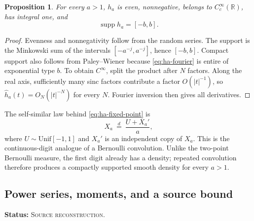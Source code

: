 \documentclass[11pt,oneside]{article}
\newtheorem{proposition}[theorem]{Proposition}
\theoremstyle{definition}
\theoremstyle{remark}
\newcommand{\supp}{\operatorname{supp}}
\newcommand{\R}{\mathbb{R}}
\newcommand{\SourceStatus}{\textcolor{SourceBlue}{\textsc{Source reconstruction}}}
\newcommand{\status}[1]{\par\smallskip\noindent\textbf{Status:} #1.\par\smallskip}
\begin{document}
\begin{proposition}
For every \(a>1\), \(h_a\) is even, nonnegative, belongs to \(C_c^\infty(\R)\), has integral one, and
\begin{equation}
  \supp h_a=[-b,b].
  \label{eq:ha-support}
\end{equation}
\end{proposition}

\begin{proof}
Evenness and nonnegativity follow from the random series.  The support is the Minkowski sum of the intervals \([-a^{-j},a^{-j}]\), hence \([-b,b]\).  Compact support also follows from Paley--Wiener because \eqref{eq:ha-fourier} is entire of exponential type \(b\).  To obtain \(C^\infty\), split the product after \(N\) factors.  Along the real axis, sufficiently many sinc factors contribute a factor \(O(|t|^{-1})\), so \(\widehat h_a(t)=O_N(|t|^{-N})\) for every \(N\).  Fourier inversion then gives all derivatives.
\end{proof}

The self-similar law behind \eqref{eq:ha-fixed-point} is
\begin{equation}
  X_a\ \overset{d}=\ \frac{U+X_a'}{a},
  \label{eq:distributional-fixed-point}
\end{equation}
where \(U\sim\mathrm{Unif}[-1,1]\) and \(X_a'\) is an independent copy of \(X_a\).  This is the continuous-digit analogue of a Bernoulli convolution.  Unlike the two-point Bernoulli measure, the first digit already has a density; repeated convolution therefore produces a compactly supported smooth density for every \(a>1\).

\subsection{Power series, moments, and a source bound}
\status{\SourceStatus}
\end{document}
